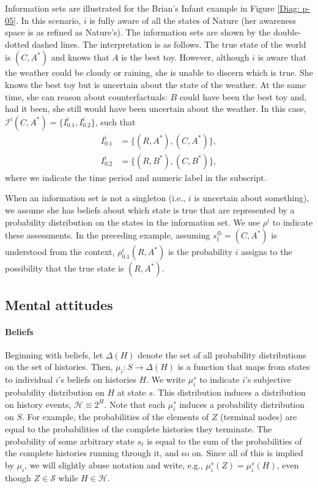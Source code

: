 \documentclass[
11pt,
titlepage,
reqno,
]{article}%
\theoremstyle{definition}
\begin{document}
	Information sets are illustrated for the Brian's Infant example in Figure \ref{Diag: p-05}. 
	In this scenario, $i$ is fully aware of all the states of Nature (her awareness space is as refined as Nature's). The information sets are shown by the double-dotted dashed lines. 
	The interpretation is as follows. 
	The true state of the world is $(C,A^\ast)$ and knows that $A$ is the best toy. 
	However, although $i$ is aware that the weather could be cloudy or raining, she is unable to discern which is true. 
	She knows the best toy but is uncertain about the state of the weather. 
	At the same time, she can reason about counterfactuals: $B$ could have been the best toy and, had it been, she still would have been uncertain about the weather. 
	In this case, $\mathcal{I}^i(C,A^\ast)=\{I^i_{0.1},I^i_{0.2}\}$, such that
	\begin{align*}
		I^i_{0.1}&=\{(R,A^\ast),(C,A^\ast)\},\\
		I^i_{0.2}&=\{(R,B^\ast),(C,B^\ast)\},
	\end{align*}
	where we indicate  the time period and numeric label in the subscript.
	
	When an information set is not a singleton (i.e., $i$ is uncertain about something), we assume she has beliefs about which state is true that are represented by a probability distribution on the states in the information set. 
	We use $\rho^i$ to indicate these assessments. 
	In the preceding example, assuming $s^\oplus_t=(C,A^\ast)$ is understood from the context, $\rho^i_{0.1}(R,A^\ast)$ is the probability $i$ assigns to the possibility that the true state is $(R,A^\ast)$.
	\subsection{Mental attitudes\label{sec:attitudes}}
	
	\paragraph{Beliefs \label{para: beliefs}}
	Beginning with beliefs, let $\Delta(H)$ denote the set of all probability distributions on the set of histories. 
	Then,  $\mu_i:S\rightarrow \Delta(H)$ is a function that maps from states to individual $i$'s beliefs on histories $H$. 
	We write  $\mu_i^s$ to indicate $i$'s subjective probability distribution on $H$ at state $s$.
	This distribution induces a distribution on history events, $\mathcal{H}\equiv 2^H$. 
	Note that each $\mu_i^s$ induces a probability distribution on $S$.
	For example, the probabilities of the elements of $Z$ (terminal nodes) are equal to the probabilities of the complete histories they terminate. 
	The probability of some arbitrary state $s_t$ is equal to the sum of the probabilities of the complete histories running through it, and so on.
	Since all of this is implied by $\mu_i$, we will slightly abuse notation and write, e.g.,  $\mu_i^s(Z)=\mu_i^s(H)$, even though $Z\in \mathcal{S}$ while $H\in \mathcal{H}$.
	
\end{document}
